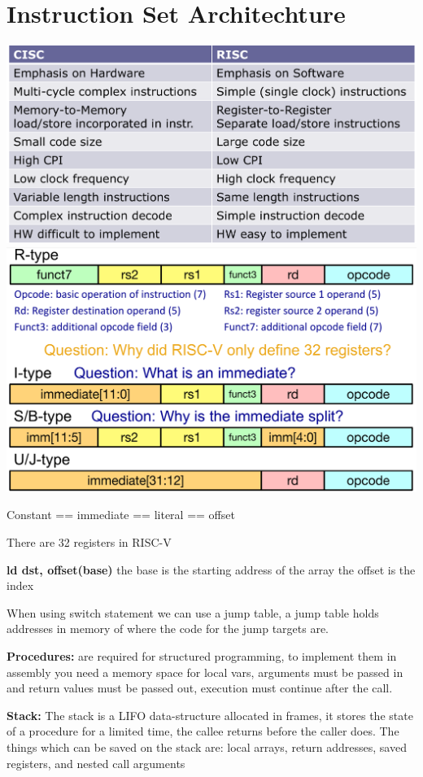 \section{Instruction Set Architechture}
\includegraphics[width=\linewidth]{png/risc.png}
\includegraphics[width=\linewidth]{png/isa.png}

Constant == immediate == literal == offset

There are 32 registers in RISC-V

\textbf{ld dst, offset(base)} the base is the starting address of the array the
offset is the index

When using switch statement we can use a jump table, a jump table holds addresses
in memory of where the code for the jump targets are.

\textbf{Procedures:} are required for structured programming, to implement them
in assembly you need a memory space for local vars, arguments must be passed in
and return values must be passed out, execution must continue after the call.

\textbf{Stack:} The stack is a LIFO data-structure allocated in frames, it
stores the state of a procedure for a limited time, the callee returns before
the caller does. The things which can be saved on the stack are: local arrays,
return addresses, saved registers, and nested call arguments

